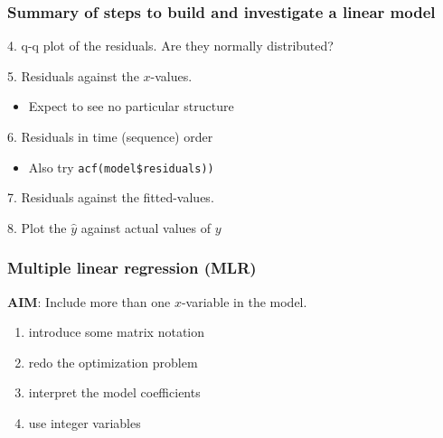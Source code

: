 \begin{frame}\frametitle{Summary of steps to build and investigate a linear model}

	4. q-q plot of the residuals. Are they normally distributed?

	5. Residuals against the $x$-values.
	\begin{itemize}
		\item	Expect to see no particular structure
	\end{itemize}

	6. Residuals in time (sequence) order
	\begin{itemize}
		\item	Also try \texttt{acf(model\$residuals))}
	\end{itemize}

	7. Residuals against the fitted-values.

	8. Plot the $\hat{y}$ against actual values of $y$
\end{frame}

\begin{frame}\frametitle{Multiple linear regression (MLR)}

	\textbf{AIM}: Include more than one $x$-variable in the model.
	\begin{enumerate}
		\item	introduce some matrix notation
		\item	redo the optimization problem
		\item	interpret the model coefficients
		\item	use integer variables
	\end{enumerate}
\end{frame}

